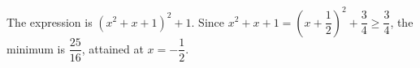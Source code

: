 The expression is $(x^2+x+1)^2+1$. Since $x^2+x+1=(x+\dfrac{1}{2})^2+\dfrac{3}{4}\ge\dfrac{3}{4}$, the minimum is $\boxed{\dfrac{25}{16}}$, attained at $x=-\dfrac{1}{2}$.
